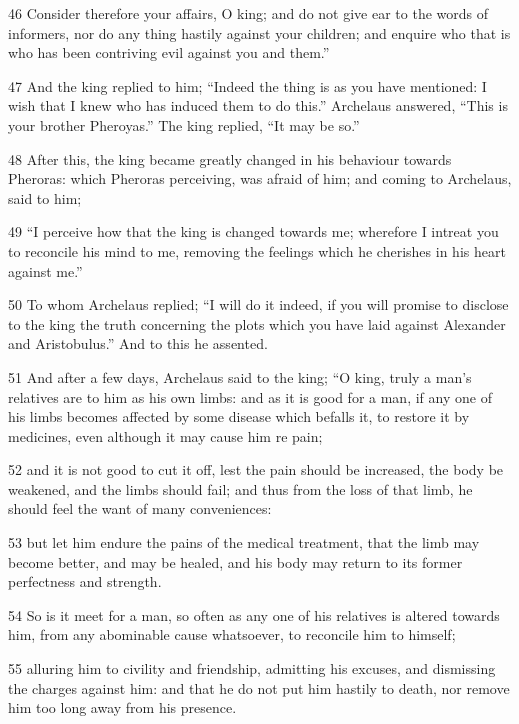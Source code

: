 \par 46 Consider therefore your affairs, O king; and do not give ear to the words of informers, nor do any thing hastily against your children; and enquire who that is who has been contriving evil against you and them.” 

\par 47 And the king replied to him; “Indeed the thing is as you have mentioned: I wish that I knew who has induced them to do this.” Archelaus answered, “This is your brother Pheroyas.” The king replied, “It may be so.” 

\par 48 After this, the king became greatly changed in his behaviour towards Pheroras: which Pheroras perceiving, was afraid of him; and coming to Archelaus, said to him; 

\par 49 “I perceive how that the king is changed towards me; wherefore I intreat you to reconcile his mind to me, removing the feelings which he cherishes in his heart against me.” 

\par 50 To whom Archelaus replied; “I will do it indeed, if you will promise to disclose to the king the truth concerning the plots which you have laid against Alexander and Aristobulus.” And to this he assented.

\par 51 And after a few days, Archelaus said to the king; “O king, truly a man’s relatives are to him as his own limbs: and as it is good for a man, if any one of his limbs becomes affected by some disease which befalls it, to restore it by medicines, even although it may cause him re pain; 

\par 52 and it is not good to cut it off, lest the pain should be increased, the body be weakened, and the limbs should fail; and thus from the loss of that limb, he should feel the want of many conveniences: 

\par 53 but let him endure the pains of the medical treatment, that the limb may become better, and may be healed, and his body may return to its former perfectness and strength. 

\par 54 So is it meet for a man, so often as any one of his relatives is altered towards him, from any abominable cause whatsoever, to reconcile him to himself; 

\par 55 alluring him to civility and friendship, admitting his excuses, and dismissing the charges against him: and that he do not put him hastily to death, nor remove him too long away from his presence. 

